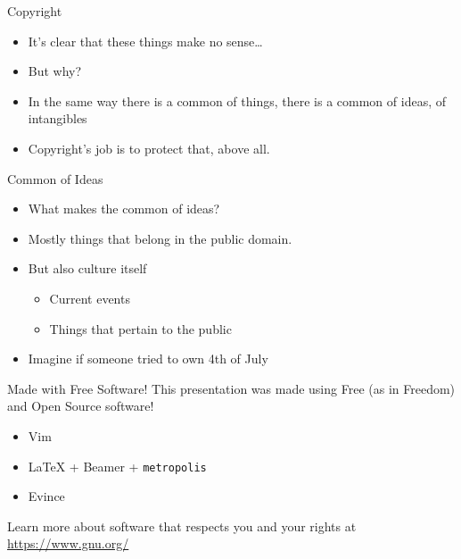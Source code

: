 \documentclass{beamer}
\begin{document}
\begin{frame}{Copyright}
    \begin{itemize}
        \item It's clear that these things make no sense\ldots\pause{}
        \item But why?\pause{}
        \item In the same way there is a common of things, there is a common of ideas, of intangibles\pause{}
        \item Copyright's job is to protect that, above all.
    \end{itemize}
\end{frame}

\begin{frame}{Common of Ideas}
    \begin{itemize}
        \item What makes the common of ideas?\pause{}
        \item Mostly things that belong in the public domain.\pause{}
        \item But also culture itself
        \begin{itemize}
            \item Current events
            \item Things that pertain to the public\pause{}
        \end{itemize} 
        \item Imagine if someone tried to own 4th of July
        
    \end{itemize}
\end{frame}

\begin{frame}{Made with Free Software!}
	This presentation was made using Free (as in Freedom) and Open Source software!
	\begin{itemize}
		\item Vim
		\item \LaTeX{} + Beamer + \texttt{metropolis}
		\item Evince
	\end{itemize}
	Learn more about software that respects you and your rights at \url{https://www.gnu.org/}
\end{frame}
\end{document}

